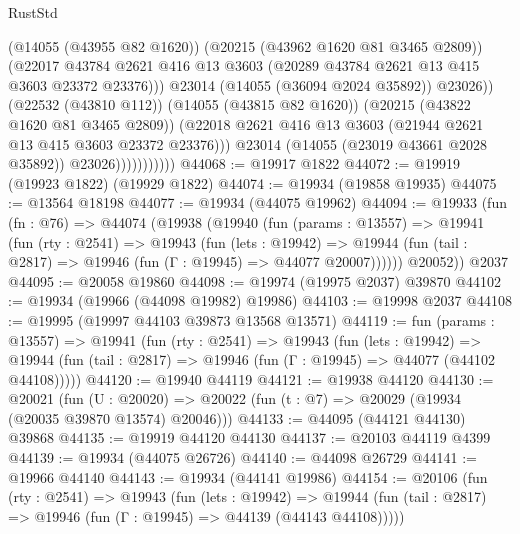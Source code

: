 \begin{lexlean}{RustStd}
\begin{coremodule}
                                  (@14055 (@43955 @82 @1620))
                                  (@20215 (@43962 @1620 @81 @3465 @2809))
                                  (@22017
                                    @43784
                                    @2621
                                    @416
                                    @13
                                    @3603
                                    (@20289 @43784 @2621 @13 @415 @3603 @23372 @23376)))
                                @23014
                                (@14055 (@36094 @2024 @35892))
                                @23026))
                            (@22532 (@43810 @112))
                            (@14055 (@43815 @82 @1620))
                            (@20215 (@43822 @1620 @81 @3465 @2809))
                            (@22018
                              @2621
                              @416
                              @13
                              @3603
                              (@21944 @2621 @13 @415 @3603 @23372 @23376)))
                          @23014
                          (@14055 (@23019 @43661 @2028 @35892))
                          @23026)))))))))))
@44068 := @19917 @1822
@44072 := @19919 (@19923 @1822) (@19929 @1822)
@44074 := @19934 (@19858 @19935)
@44075 := @13564 @18198
@44077 := @19934 (@44075 @19962)
@44094 := @19933
    (fun (fn : @76) =>
    @44074
      (@19938
        (@19940
          (fun (params : @13557) =>
          @19941
            (fun (rty : @2541) =>
            @19943
              (fun (lets : @19942) =>
              @19944 (fun (tail : @2817) => @19946 (fun (Γ : @19945) => @44077 @20007))))))
        @20052))
    @2037
@44095 := @20058 @19860
@44098 := @19974 (@19975 @2037) @39870
@44102 := @19934 (@19966 (@44098 @19982) @19986)
@44103 := @19998 @2037
@44108 := @19995 (@19997 @44103 @39873 @13568 @13571)
@44119 := fun (params : @13557) =>
  @19941
    (fun (rty : @2541) =>
    @19943
      (fun (lets : @19942) =>
      @19944 (fun (tail : @2817) => @19946 (fun (Γ : @19945) => @44077 (@44102 @44108)))))
@44120 := @19940 @44119
@44121 := @19938 @44120
@44130 := @20021
    (fun (U : @20020) => @20022 (fun (t : @7) => @20029 (@19934 (@20035 @39870 @13574) @20046)))
@44133 := @44095 (@44121 @44130) @39868
@44135 := @19919 @44120 @44130
@44137 := @20103 @44119 @4399
@44139 := @19934 (@44075 @26726)
@44140 := @44098 @26729
@44141 := @19966 @44140
@44143 := @19934 (@44141 @19986)
@44154 := @20106
    (fun (rty : @2541) =>
    @19943
      (fun (lets : @19942) =>
      @19944 (fun (tail : @2817) => @19946 (fun (Γ : @19945) => @44139 (@44143 @44108)))))

\end{coremodule}
\end{lexlean}
